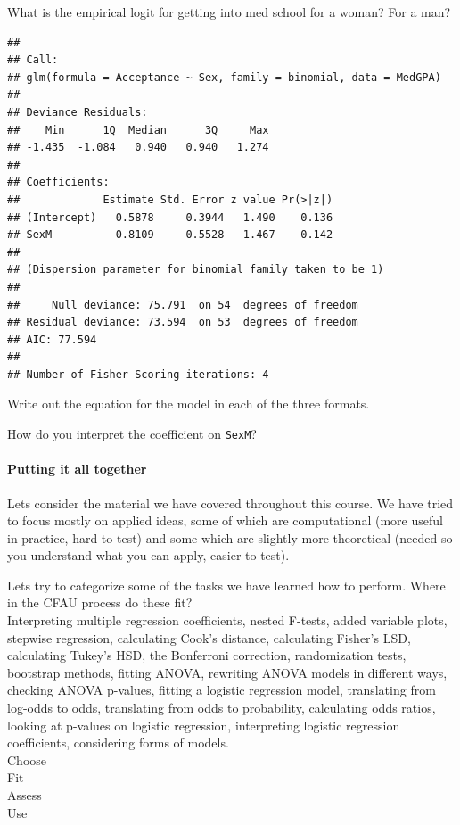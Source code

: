 \documentclass[10pt]{article}\usepackage[]{graphicx}\usepackage[]{color}
\makeatletter
\newenvironment{kframe}{%
 \def\at@end@of@kframe{}%
 \ifinner\ifhmode%
  \def\at@end@of@kframe{\end{minipage}}%
  \begin{minipage}{\columnwidth}%
 \fi\fi%
 \def\FrameCommand##1{\hskip\@totalleftmargin \hskip-\fboxsep
 \colorbox{shadecolor}{##1}\hskip-\fboxsep
     \hskip-\linewidth \hskip-\@totalleftmargin \hskip\columnwidth}%
 \MakeFramed {\advance\hsize-\width
   \@totalleftmargin\z@ \linewidth\hsize
   \@setminipage}}%
 {\par\unskip\endMakeFramed%
 \at@end@of@kframe}
\newenvironment{knitrout}{}{} %
\makeatother
\begin{document}
What is the empirical logit for getting into med school for a woman? For a man? 
\vspace{0.5in}
\begin{knitrout}\footnotesize
{}\color{fgcolor}\begin{kframe}
\begin{verbatim}
## 
## Call:
## glm(formula = Acceptance ~ Sex, family = binomial, data = MedGPA)
## 
## Deviance Residuals: 
##    Min      1Q  Median      3Q     Max  
## -1.435  -1.084   0.940   0.940   1.274  
## 
## Coefficients:
##             Estimate Std. Error z value Pr(>|z|)
## (Intercept)   0.5878     0.3944   1.490    0.136
## SexM         -0.8109     0.5528  -1.467    0.142
## 
## (Dispersion parameter for binomial family taken to be 1)
## 
##     Null deviance: 75.791  on 54  degrees of freedom
## Residual deviance: 73.594  on 53  degrees of freedom
## AIC: 77.594
## 
## Number of Fisher Scoring iterations: 4
\end{verbatim}
\end{kframe}
\end{knitrout}
\clearpage
Write out the equation for the model in each of the three formats. 
\vspace{2in}

How do you interpret the coefficient on \verb#SexM#?
\vspace{0.5in}

\paragraph{Putting it all together}
Lets consider the material we have covered throughout this course. We have tried to focus mostly on applied ideas, some of which are computational (more useful in practice, hard to test) and some which are slightly more theoretical (needed so you understand what you can apply, easier to test).

Lets try to categorize some of the tasks we have learned how to perform. Where in the CFAU process do these fit?
\\ Interpreting multiple regression coefficients, nested F-tests, added variable plots, stepwise regression, calculating Cook's distance, calculating Fisher's LSD, calculating Tukey's HSD, the Bonferroni correction, randomization tests, bootstrap methods, fitting ANOVA, rewriting ANOVA models in different ways, checking ANOVA p-values, fitting a logistic regression model, translating from log-odds to odds, translating from odds to probability, calculating odds ratios, looking at p-values on logistic regression, interpreting logistic regression coefficients, considering forms of models. 
\\
Choose
\vspace{1in}
\\
Fit
\vspace{1in}
\\
Assess
\vspace{1in}
\\
Use
\vspace{1in}
\end{document}
